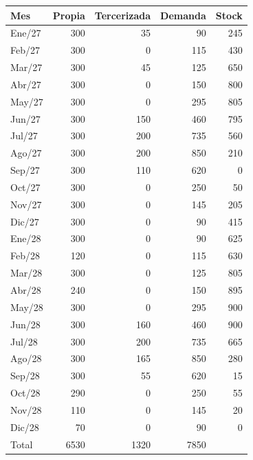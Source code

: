 \begin{tabular}{lr r r r}
\toprule
Mes & Propia & Tercerizada & Demanda & Stock \\
\midrule
Ene/27 & 300 & 35 & 90 & 245 \\
Feb/27 & 300 & 0 & 115 & 430 \\
Mar/27 & 300 & 45 & 125 & 650 \\
Abr/27 & 300 & 0 & 150 & 800 \\
May/27 & 300 & 0 & 295 & 805 \\
Jun/27 & 300 & 150 & 460 & 795 \\
Jul/27 & 300 & 200 & 735 & 560 \\
Ago/27 & 300 & 200 & 850 & 210 \\
Sep/27 & 300 & 110 & 620 & 0 \\
Oct/27 & 300 & 0 & 250 & 50 \\
Nov/27 & 300 & 0 & 145 & 205 \\
Dic/27 & 300 & 0 & 90 & 415 \\
Ene/28 & 300 & 0 & 90 & 625 \\
Feb/28 & 120 & 0 & 115 & 630 \\
Mar/28 & 300 & 0 & 125 & 805 \\
Abr/28 & 240 & 0 & 150 & 895 \\
May/28 & 300 & 0 & 295 & 900 \\
Jun/28 & 300 & 160 & 460 & 900 \\
Jul/28 & 300 & 200 & 735 & 665 \\
Ago/28 & 300 & 165 & 850 & 280 \\
Sep/28 & 300 & 55 & 620 & 15 \\
Oct/28 & 290 & 0 & 250 & 55 \\
Nov/28 & 110 & 0 & 145 & 20 \\
Dic/28 & 70 & 0 & 90 & 0 \\
\midrule
Total & 6530 & 1320 & 7850 &  \\
\bottomrule
\end{tabular}
